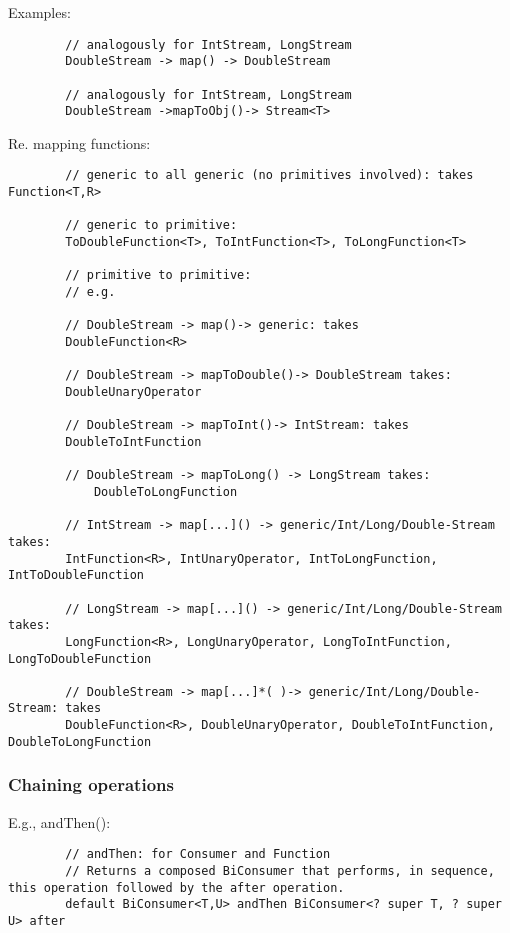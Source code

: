 \documentclass{scrartcl}
\begin{document}
    Examples:

    \begin{lstlisting}
        // analogously for IntStream, LongStream
        DoubleStream -> map() -> DoubleStream

        // analogously for IntStream, LongStream
        DoubleStream ->mapToObj()-> Stream<T>

    \end{lstlisting}

    Re. mapping functions:

    \begin{lstlisting}
        // generic to all generic (no primitives involved): takes Function<T,R>

        // generic to primitive:
        ToDoubleFunction<T>, ToIntFunction<T>, ToLongFunction<T>

        // primitive to primitive:
        // e.g.

        // DoubleStream -> map()-> generic: takes
        DoubleFunction<R>

        // DoubleStream -> mapToDouble()-> DoubleStream takes:
        DoubleUnaryOperator

        // DoubleStream -> mapToInt()-> IntStream: takes
        DoubleToIntFunction

        // DoubleStream -> mapToLong() -> LongStream takes:
            DoubleToLongFunction

        // IntStream -> map[...]() -> generic/Int/Long/Double-Stream takes:
        IntFunction<R>, IntUnaryOperator, IntToLongFunction, IntToDoubleFunction

        // LongStream -> map[...]() -> generic/Int/Long/Double-Stream takes:
        LongFunction<R>, LongUnaryOperator, LongToIntFunction, LongToDoubleFunction

        // DoubleStream -> map[...]*( )-> generic/Int/Long/Double-Stream: takes
        DoubleFunction<R>, DoubleUnaryOperator, DoubleToIntFunction, DoubleToLongFunction
    \end{lstlisting}

\subsubsection{Chaining operations}

    E.g., andThen():

    \begin{lstlisting}
        // andThen: for Consumer and Function
        // Returns a composed BiConsumer that performs, in sequence, this operation followed by the after operation.
        default BiConsumer<T,U> andThen BiConsumer<? super T, ? super U> after
    \end{lstlisting}
\end{document}
